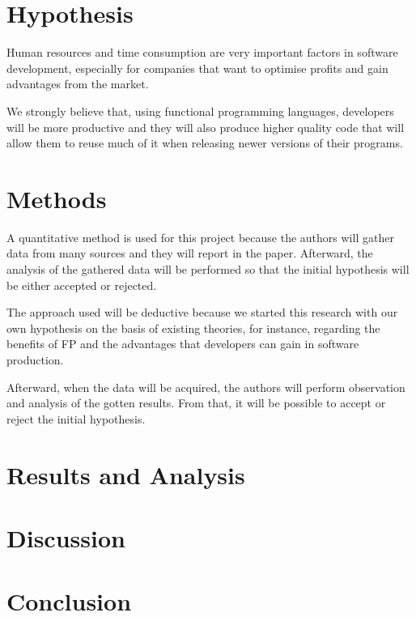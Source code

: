 \documentclass{proc}
\begin{document}
\section{Hypothesis}

Human resources and time consumption are very important factors in software development, especially for companies that want to optimise profits and gain advantages from the market. 

We strongly believe that, using functional programming languages, developers will be more productive and they will also produce higher quality code that will allow them to reuse much of it when releasing newer versions of their programs.

\section{Methods}

A quantitative method is used for this project because the authors will gather data from many sources and they will report in the paper. Afterward, the analysis of the gathered data will be performed so that the initial hypothesis will be either accepted or rejected.

The approach used will be deductive because we started this research with our own hypothesis on the basis of existing theories, for instance, regarding the benefits of FP and the advantages that developers can gain in software production.

Afterward, when the data will be acquired, the authors will perform observation and analysis of the gotten results. From that, it will be possible to accept or reject the initial hypothesis.

\section{Results and Analysis}

\section{Discussion}

\section{Conclusion}



\end{document}
